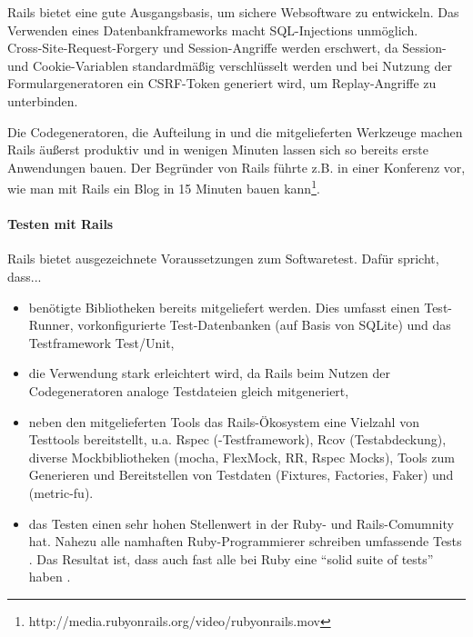 Rails bietet eine gute Ausgangsbasis, um sichere Websoftware zu entwickeln. Das Verwenden eines Datenbankframeworks macht SQL-Injections unmöglich. \\
Cross-Site-Request-Forgery und Session-Angriffe werden erschwert, da Session- und Cookie-Variablen standardmäßig verschlüsselt werden und bei Nutzung der Formulargeneratoren ein CSRF-Token generiert wird, um Replay-Angriffe zu unterbinden.

Die Codegeneratoren, die Aufteilung in  und die mitgelieferten Werkzeuge machen Rails äußerst produktiv und in wenigen Minuten lassen sich so bereits erste Anwendungen bauen. Der Begründer von Rails führte z.B. in einer Konferenz vor, wie man mit Rails ein Blog in 15 Minuten bauen kann\footnote{http://media.rubyonrails.org/video/rubyonrails.mov}.


\paragraph{Testen mit Rails}
Rails bietet ausgezeichnete Voraussetzungen zum Softwaretest. Dafür spricht, dass...

\begin{itemize}
  \item benötigte Bibliotheken bereits mitgeliefert werden. Dies umfasst einen Test-Runner, vorkonfigurierte Test-Datenbanken (auf Basis von SQLite) und das Testframework Test/Unit,
  \item die Verwendung stark erleichtert wird, da Rails beim Nutzen der Codegeneratoren analoge Testdateien gleich mitgeneriert,
 \item neben den mitgelieferten Tools das Rails-Ökosystem eine Vielzahl von Testtools bereitstellt, u.a. Rspec (-Testframework), Rcov (Testabdeckung), diverse Mockbibliotheken (mocha, FlexMock, RR, Rspec Mocks), Tools zum Generieren und Bereitstellen von Testdaten (Fixtures, Factories, Faker) und  (metric-fu).
 \item das Testen einen sehr hohen Stellenwert in der Ruby- und Rails-Comumnity hat. Nahezu alle namhaften Ruby-Programmierer schreiben umfassende Tests \citep{devries_rails_2008}. Das Resultat ist, dass auch fast alle  bei Ruby eine "`solid suite of tests"' haben \citep{devries_rails_2008}.
\end{itemize}

